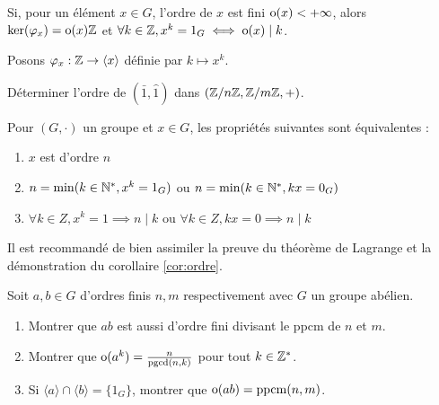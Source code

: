 \documentclass[11pt,a4paper]{report}
\begin{document}
\begin{remark}
    Si, pour un élément $x \in G$, l'ordre de $x$ est fini $\mathrm{o}(x) < +\infty$, alors $\ker(\varphi_x) = \mathrm{o}(x) \mathbb{Z}$ et $\forall k \in \mathbb{Z}, x^k = 1_G \iff \mathrm{o}(x) \mid k$.
\end{remark}

\begin{exercise}
    Posons $\varphi_x : \mathbb{Z} \to \langle x \rangle$ définie par $k \mapsto x^k$.

    Déterminer l'ordre de $(\bar 1, \hat 1)$ dans $(\mathbb{Z}/n\mathbb{Z}, \mathbb{Z}/m\mathbb{Z}, +)$.
\end{exercise}

\begin{corollary}
    \label{cor:ordre}
    Pour $(G,\cdot)$ un groupe et $x \in G$, les propriétés suivantes sont équivalentes :
    \begin{enumerate}
        \item $x$ est d'ordre $n$
        \item $n = \min(k \in \mathbb{N}^*, x^k = 1_G)$ ou $n = \min(k \in \mathbb{N}^*, kx = 0_G)$
        \item $\boxed{\forall k \in Z, x^k = 1 \implies n \mid k}$ ou $\boxed{\forall k \in Z, kx = 0 \implies n \mid k}$
    \end{enumerate}
\end{corollary}

Il est recommandé de bien assimiler la preuve du théorème de Lagrange et la démonstration du corollaire \ref{cor:ordre}.

\begin{exercise}
    Soit $a,b \in G$ d'ordres finis $n,m$ respectivement avec $G$ un groupe abélien.

    \begin{enumerate}
        \item Montrer que $ab$ est aussi d'ordre fini divisant le ppcm de $n$ et $m$.
        \item Montrer que $\mathrm{o}(a^k) = \frac{n}{\mathrm{pgcd}(n,k)}$ pour tout $k \in \mathbb{Z}^*$.
        \item Si $\langle a \rangle \cap \langle b \rangle = \{ 1_G \}$, montrer que $\mathrm{o}(ab) = \mathrm{ppcm}(n,m)$.
    \end{enumerate}
\end{exercise}
\end{document}
